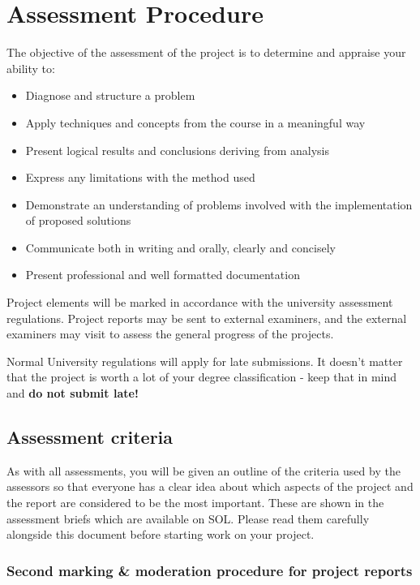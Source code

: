 \chapter{Assessment Procedure}

The objective of the assessment of the project is to determine and appraise your ability to:

\begin{itemize}
    \item Diagnose and structure a problem
    \item Apply techniques and concepts from the course in a meaningful way
    \item Present logical results and conclusions deriving from analysis
    \item Express any limitations with the method used
    \item Demonstrate an understanding of problems involved with the implementation of proposed solutions
    \item Communicate both in writing and orally, clearly and concisely
    \item Present professional and well formatted documentation
\end{itemize}

Project elements will be marked in accordance with the university assessment regulations. Project reports may be sent to external examiners, and the external examiners may visit to assess the general progress of the projects. 

\begin{tcolorbox}
    Normal University regulations will apply for late submissions. It doesn't matter that the project is worth a lot of your degree classification - keep that in mind and \textbf{do not submit late!}
\end{tcolorbox}

\section{Assessment criteria}


As with all assessments, you will be given an outline of the criteria used by the assessors so that everyone has a clear idea about which aspects of the project and the report are considered to be the most important. These are shown in the assessment briefs which are available on SOL. Please read them carefully alongside this document before starting work on your project.


\subsection{Second marking \& moderation procedure for project reports}

